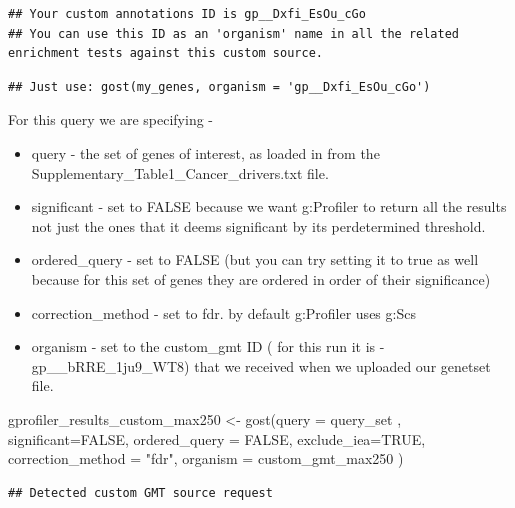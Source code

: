 \documentclass[
]{book}
\newenvironment{Shaded}{\begin{snugshade}}{\end{snugshade}}
\newcommand{\AttributeTok}[1]{\textcolor[rgb]{0.77,0.63,0.00}{#1}}
\newcommand{\ConstantTok}[1]{\textcolor[rgb]{0.00,0.00,0.00}{#1}}
\newcommand{\FunctionTok}[1]{\textcolor[rgb]{0.00,0.00,0.00}{#1}}
\newcommand{\NormalTok}[1]{#1}
\newcommand{\OtherTok}[1]{\textcolor[rgb]{0.56,0.35,0.01}{#1}}
\newcommand{\StringTok}[1]{\textcolor[rgb]{0.31,0.60,0.02}{#1}}
\providecommand{\tightlist}{%
  \setlength{\itemsep}{0pt}\setlength{\parskip}{0pt}}
\begin{document}
\begin{verbatim}
## Your custom annotations ID is gp__Dxfi_EsOu_cGo
## You can use this ID as an 'organism' name in all the related enrichment tests against this custom source.
\end{verbatim}

\begin{verbatim}
## Just use: gost(my_genes, organism = 'gp__Dxfi_EsOu_cGo')
\end{verbatim}

For this query we are specifying -

\begin{itemize}
\tightlist
\item
  query - the set of genes of interest, as loaded in from the Supplementary\_Table1\_Cancer\_drivers.txt file.
\item
  significant - set to FALSE because we want g:Profiler to return all the results not just the ones that it deems significant by its perdetermined threshold.
\item
  ordered\_query - set to FALSE (but you can try setting it to true as well because for this set of genes they are ordered in order of their significance)
\item
  correction\_method - set to fdr. by default g:Profiler uses g:Scs
\item
  organism - set to the custom\_gmt ID ( for this run it is - gp\_\_bRRE\_1ju9\_WT8) that we received when we uploaded our genetset file.
\end{itemize}

\begin{Shaded}
\begin{Highlighting}[]
\NormalTok{gprofiler\_results\_custom\_max250 }\OtherTok{\textless{}{-}} \FunctionTok{gost}\NormalTok{(}\AttributeTok{query =}\NormalTok{ query\_set ,}
                                     \AttributeTok{significant=}\ConstantTok{FALSE}\NormalTok{,}
                                 \AttributeTok{ordered\_query =} \ConstantTok{FALSE}\NormalTok{,}
                                  \AttributeTok{exclude\_iea=}\ConstantTok{TRUE}\NormalTok{,}
                                     \AttributeTok{correction\_method =} \StringTok{"fdr"}\NormalTok{,}
                                 \AttributeTok{organism =}\NormalTok{ custom\_gmt\_max250}
\NormalTok{                                     )}
\end{Highlighting}
\end{Shaded}

\begin{verbatim}
## Detected custom GMT source request
\end{verbatim}
\end{document}
